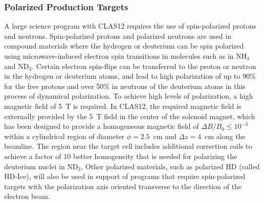 \documentclass[final,3p,twocolumn]{elsarticle}
\begin{document}
\subsubsection{Polarized Production Targets} 

A large science program with CLAS12 requires the use of spin-polarized protons and neutrons. Spin-polarized
protons and polarized neutrons are used in compound materials where the hydrogen or deuterium can be spin
polarized using microwave-induced electron spin transitions in molecules such as in NH$_3$ and ND$_3$. Certain
electron spin-flips can be transferred to the proton or neutron in the hydrogen or deuterium atoms, and lead to high
polarization of up to 90\% for the free protons and over 50\% in neutrons of the deuterium atoms in this process
of dynamical polarization. To achieve high levels of polarization, a high magnetic field of 5~T is required. In CLAS12,
the required magnetic field is externally provided by the 5~T field in the center of the solenoid magnet, which has
been designed to provide a homogeneous magnetic field of $\Delta B / B_0 \leq 10^{-3}$ within a cylindrical region
of diameter $\phi = 2.5$~cm and $\Delta{z} = 4$~cm along the beamline.  The region near the target cell includes
additional correction coils to achieve a factor of 10 better homogeneity that is needed for polarizing the deuterium
nuclei in ND$_3$. Other polarized materials, such as polarized HD (called HD-Ice), will also be used in support of
programs that require spin-polarized targets with the polarization axis oriented transverse to the direction of the
electron beam.        
\end{document}
